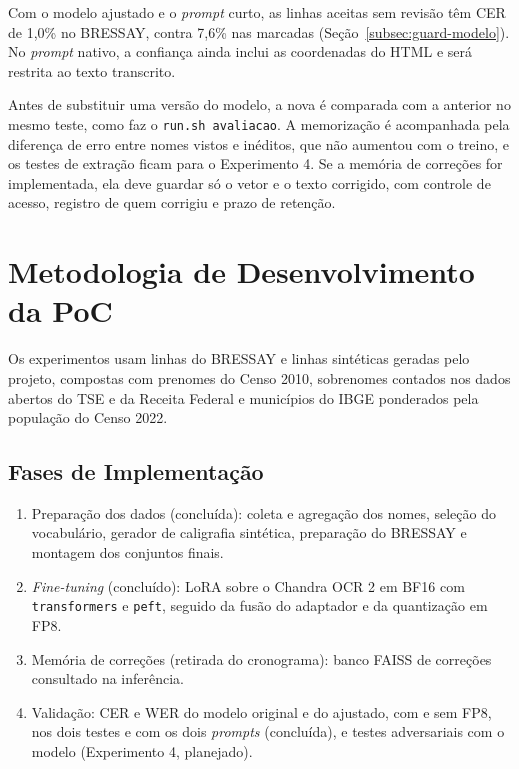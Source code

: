 \documentclass[12pt,a4paper]{article}
\begin{document}
Com o modelo ajustado e o \emph{prompt} curto, as linhas aceitas sem revisão têm CER de 1,0\% no BRESSAY, contra 7,6\% nas marcadas (Seção~\ref{subsec:guard-modelo}). No \emph{prompt} nativo, a confiança ainda inclui as coordenadas do HTML e será restrita ao texto transcrito.

Antes de substituir uma versão do modelo, a nova é comparada com a anterior no mesmo teste, como faz o \texttt{run.sh avaliacao}. A memorização é acompanhada pela diferença de erro entre nomes vistos e inéditos, que não aumentou com o treino, e os testes de extração ficam para o Experimento 4. Se a memória de correções for implementada, ela deve guardar só o vetor e o texto corrigido, com controle de acesso, registro de quem corrigiu e prazo de retenção.

\section{Metodologia de Desenvolvimento da PoC}
\label{sec:metodologia}

Os experimentos usam linhas do BRESSAY e linhas sintéticas geradas pelo projeto, compostas com prenomes do Censo 2010, sobrenomes contados nos dados abertos do TSE e da Receita Federal e municípios do IBGE ponderados pela população do Censo 2022.

\subsection{Fases de Implementação}
\begin{enumerate}
    \item Preparação dos dados (concluída): coleta e agregação dos nomes, seleção do vocabulário, gerador de caligrafia sintética, preparação do BRESSAY e montagem dos conjuntos finais.
    \item \emph{Fine-tuning} (concluído): LoRA sobre o Chandra OCR 2 em BF16 com \texttt{transformers} e \texttt{peft}, seguido da fusão do adaptador e da quantização em FP8.
    \item Memória de correções (retirada do cronograma): banco FAISS de correções consultado na inferência.
    \item Validação: CER e WER do modelo original e do ajustado, com e sem FP8, nos dois testes e com os dois \emph{prompts} (concluída), e testes adversariais com o modelo (Experimento 4, planejado).
\end{enumerate}
\end{document}
